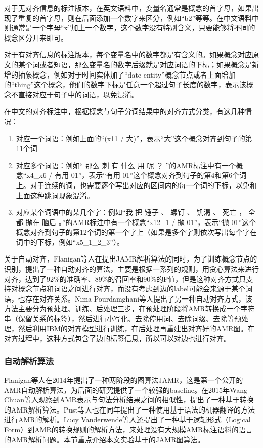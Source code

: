 \documentclass[master, winfont]{njuthesis}
\begin{document}
对于无对齐信息的标注版本，在英文语料中，变量名通常是概念的首字母，如果出现了重复的首字母，则在后面添加一个数字来区分，例如“b2”等等。在中文语料中则通常是一个字母“x”加上一个数字，这个数字没有特别含义，只要能够将不同的概念区分开来即可。

对于有对齐信息的标注版本，每个变量名中的数字都是有含义的。如果概念对应原文的某个词或者短语，那么变量名的数字后缀就是对应词语的下标；如果概念是新增的抽象概念，例如对于时间实体加了“date-entity”概念节点或者上面增加的“thing”这个概念，他们的数字下标是任意一个超过句子长度的数字，表示该概念不直接对应于句子中的词语，以免混淆。

在中文的对齐标注中，根据概念与句子分词结果中的对齐方式分类，有这几种情况：
\begin{enumerate}
	\item 对应一个词语：例如上面的“(x11 / 大)”，表示“大”这个概念对齐到句子的第11个词
	\item 对应多个词语：例如“ 那么 刺 有 什么 用 呢 ？ ”的AMR标注中有一个概念“x4\_x6 / 有用-01”，表示“有用-01”这个概念对齐到句子的第4和第6个词上。对于连续的词，也需要逐个写出对应的区间内的每一个词的下标，以免和上面这种跳词现象混淆。
	\item 对应某个词语中的某几个字：例如“我 把 锤子 、 螺钉 、 饥渴 、 死亡 ， 全都 抛在 脑后 。”的AMR标注中有一个概念“x12\_1 / 抛-01”，表示“抛-01”这个概念对齐到句子的第12个词的第一个字上（如果是多个字则依次写出每个字在词中的下标，例如“x5\_1\_2\_3”）。
\end{enumerate}

关于自动对齐，Flanigan等人\cite{Flanigan2014}在提出JAMR解析算法的同时，为了训练概念节点的识别，提出了一种自动对齐的算法，主要是根据一系列的规则，用贪心算法来进行对齐，达到了92\%的准确率、89\%的召回率和90\%的F值，但是这种对齐方式只支持对概念节点和词语之间进行对齐，而没有考虑到边的label可能会来源于某个词语，也存在对齐关系。Nima Pourdamghani等人\cite{Pourdamghani2014}提出了另一种自动对齐方式，该方法主要分为预处理、训练、后处理三步，在预处理阶段将AMR转换成一个字符串（保留关系的标签），然后进行小写化、去除停用词、去除词缀、去除等预处理，然后利用IBM的对齐模型进行训练，在后处理再重建出对齐好的AMR图。在对齐过程中，这种方式包含了边的标签信息，所以可以对边也进行对齐。

\subsubsection{自动解析算法}
Flanigan等人\cite{Flanigan2014}在2014年提出了一种两阶段的图算法JAMR，这是第一个公开的AMR自动解析算法，为后面的研究提供了一个较强的baseline。在2015年Wang Chuan\cite{Wang2015}等人观察到AMR表示与句法分析结果之间的相似性，提出了一种基于转换的AMR解析算法。Pust等人\cite{Pust2015}也在同年提出了一种使用基于语法的机器翻译的方法进行AMR的解析。Lucy Vanderwende等人\cite{Vanderwende2015}还提出了一种基于逻辑形式（Logical Form）到AMR的转换规则的解析方法，来处理没有大规模AMR标注语料的语言的AMR解析问题。本节重点介绍本文实验基于的JAMR图算法。
\end{document}
